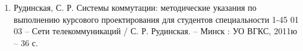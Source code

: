 
\begin{enumerate}[{label=\arabic{*}}]
    \item Рудинская, С. Р. Системы коммутации:
          методические указания по выполнению курсового проектирования
          для студентов специальности 1-45 01 03 --
          Сети телекоммуникаций / С. Р. Рудинская. -- Минск : УО ВГКС,
          2011ю -- 36 с.
          \label{book:Methodical Book}
\end{enumerate}
